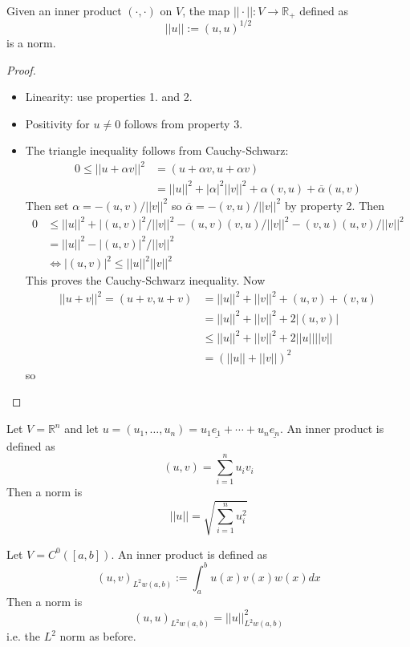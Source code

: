 \begin{theorem}
	Given an inner product $(\cdot, \cdot)$ on $V$, the map $||\cdot||: V \rightarrow \mathbb{R}_+$ defined as
	\[
		||u|| := {(u, u)}^{1/2}
	\]
	is a norm.
\end{theorem}

\begin{proof}
	\hfill
	\begin{itemize}
		\item Linearity: use properties 1. and 2.
		\item Positivity for $u \ne 0$ follows from property 3.
		\item The triangle inequality follows from Cauchy-Schwarz:
		\[
			\begin{aligned}
				0 \le ||u + \alpha v||^2 & = (u + \alpha v, u + \alpha v) \\
				& = ||u||^2 + |\alpha|^2 ||v||^2 + \alpha (v, u) + \overline{\alpha} (u, v)
			\end{aligned}
		\]
		Then set $\alpha = -(u, v) / ||v||^2$ so $\overline{\alpha} = -(v, u) / ||v||^2$ by property 2. Then
		\[
			\begin{aligned}
				0 & \le ||u||^2 + |(u, v)|^2 / ||v||^2 - (u, v) (v, u) / ||v||^2 - (v, u) (u, v) / ||v||^2 \\
				& = ||u||^2 - |(u, v)|^2 / ||v||^2 \\
				& \Longleftrightarrow |(u, v)|^2 \le ||u||^2 ||v||^2
			\end{aligned}
		\]
		This proves the Cauchy-Schwarz inequality. Now
		\[
			\begin{aligned}
				||u + v||^2 = (u + v, u + v) & = ||u||^2 + ||v||^2 + (u, v) + (v, u) \\
				& = ||u||^2 + ||v||^2 + 2 |(u, v)| \\
				& \le ||u||^2 + ||v||^2 + 2 ||u|| ||v|| \\
				& = {(||u|| + ||v||)}^2
			\end{aligned}
		\]
		so
	\end{itemize}
\end{proof}

\begin{example}\label{exa:innerProdRN}
	Let $V = \mathbb{R}^n$ and let $u = (u_1, \ldots, u_n) = u_1 \underline{e_1} + \cdots + u_n \underline{e_n}$. An inner product is defined as
	\[
		(u, v) = \sum_{i = 1}^{n} u_i v_i
	\]
	Then a norm is
	\[
		||u|| = \sqrt{\sum_{i = 1}^{n} u_i^2}
	\]
\end{example}

\begin{example}
	Let $V = C^0 ([a, b])$. An inner product is defined as
	\[
		{(u, v)}_{L^2 w (a, b)} := \int_{a}^{b} u(x) v(x) w(x) dx
	\]
	Then a norm is
	\[
		{(u, u)}_{L^2 w (a, b)} = ||u||^2_{L^2 w (a, b)}
	\]
	i.e. the $L^2$ norm as before.
\end{example}

